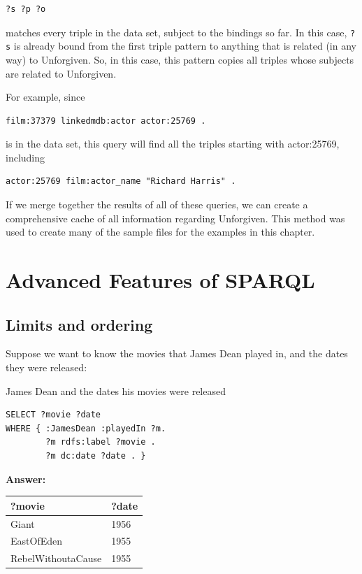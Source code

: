 \begin{challenge}
\begin{lstlisting}
?s ?p ?o
\end{lstlisting}

matches every triple in the data set, subject to the bindings so far. In
this case, \texttt{?s} is already bound from the first triple pattern to anything
that is related (in any way) to Unforgiven. So, in this case, this
pattern copies all triples whose subjects are related to Unforgiven.

For example, since

\begin{lstlisting}
film:37379 linkedmdb:actor actor:25769 .
\end{lstlisting}

is in the data set, this query will find all the triples starting with
actor:25769, including

\begin{lstlisting}
actor:25769 film:actor_name "Richard Harris" .
\end{lstlisting}

If we merge together the results of all of these queries, we can create
a comprehensive cache of all information regarding Unforgiven. This
method was used to create many of the sample files for the examples in
this chapter.
\end{challenge}

\section{Advanced Features of SPARQL}

\subsection{Limits and ordering}

Suppose we want to know the movies that James Dean played in, and the
dates they were released:

\begin{query}James Dean and the dates his movies were released\end{query}

\begin{lstlisting}
SELECT ?movie ?date
WHERE { :JamesDean :playedIn ?m.
        ?m rdfs:label ?movie .
        ?m dc:date ?date . }
\end{lstlisting}


\textbf{\textbf{Answer:}}

\begin{tabular}{|ll|}
\hline
?movie&?date\\
\hline
Giant&1956\\
EastOfEden&1955\\
RebelWithoutaCause&1955\\
\hline
\end{tabular}

